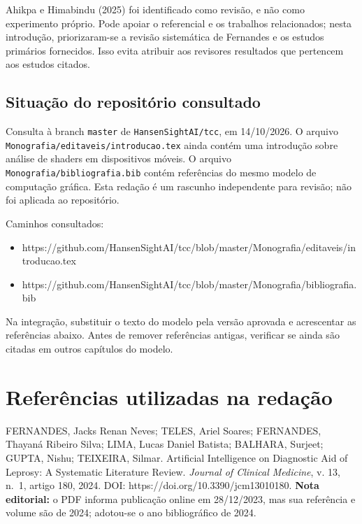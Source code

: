 \documentclass[
]{article}
\providecommand{\tightlist}{%
  \setlength{\itemsep}{0pt}\setlength{\parskip}{0pt}}
\begin{document}
Ahikpa e Himabindu (2025) foi identificado como revisão, e não como
experimento próprio. Pode apoiar o referencial e os trabalhos
relacionados; nesta introdução, priorizaram-se a revisão sistemática de
Fernandes e os estudos primários fornecidos. Isso evita atribuir aos
revisores resultados que pertencem aos estudos citados.

\subsection{Situação do repositório
consultado}\label{situauxe7uxe3o-do-reposituxf3rio-consultado}

Consulta à branch \texttt{master} de \texttt{HansenSightAI/tcc}, em
14/10/2026. O arquivo \texttt{Monografia/editaveis/introducao.tex} ainda
contém uma introdução sobre análise de shaders em dispositivos móveis. O
arquivo \texttt{Monografia/bibliografia.bib} contém referências do mesmo
modelo de computação gráfica. Esta redação é um rascunho independente
para revisão; não foi aplicada ao repositório.

Caminhos consultados:

\begin{itemize}
\tightlist
\item
  https://github.com/HansenSightAI/tcc/blob/master/Monografia/editaveis/introducao.tex
\item
  https://github.com/HansenSightAI/tcc/blob/master/Monografia/bibliografia.bib
\end{itemize}

Na integração, substituir o texto do modelo pela versão aprovada e
acrescentar as referências abaixo. Antes de remover referências antigas,
verificar se ainda são citadas em outros capítulos do modelo.

\section{Referências utilizadas na
redação}\label{referuxeancias-utilizadas-na-redauxe7uxe3o}

FERNANDES, Jacks Renan Neves; TELES, Ariel Soares; FERNANDES, Thayaná
Ribeiro Silva; LIMA, Lucas Daniel Batista; BALHARA, Surjeet; GUPTA,
Nishu; TEIXEIRA, Silmar. Artificial Intelligence on Diagnostic Aid of
Leprosy: A Systematic Literature Review. \emph{Journal of Clinical
Medicine}, v. 13, n.~1, artigo 180, 2024. DOI:
https://doi.org/10.3390/jcm13010180. \textbf{Nota editorial:} o PDF
informa publicação online em 28/12/2023, mas sua referência e volume são
de 2024; adotou-se o ano bibliográfico de 2024.
\end{document}

